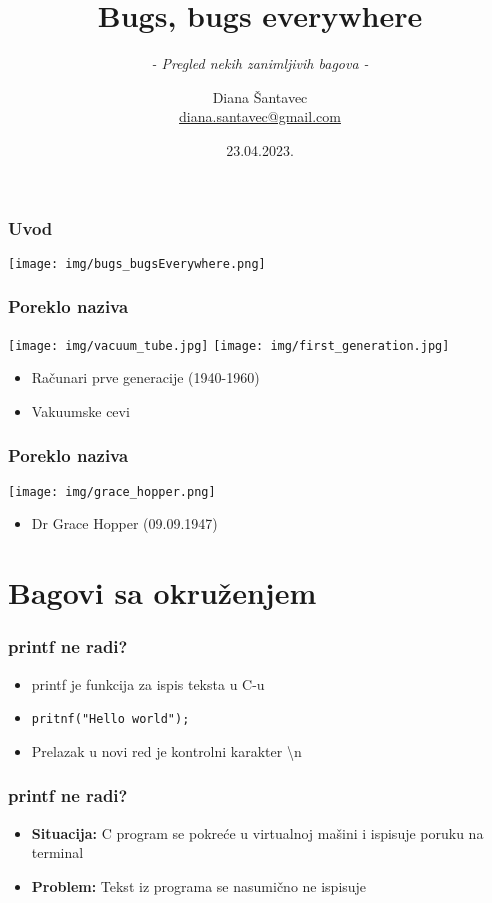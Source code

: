 \documentclass{beamer}
\title{Bugs, bugs everywhere}
\subtitle[]{\textit{ - Pregled nekih zanimljivih bagova -}}
\author[Diana Šantavec]{Diana Šantavec \\ \small \url{diana.santavec@gmail.com}}
\institute{Istraživačka stanica Petnica}
\date{23.04.2023.}
\begin{document}
\frame{\titlepage}


\begin{frame}
\frametitle{Uvod}
\begin{center}
    \texttt{[image: img/bugs\_bugsEverywhere.png]}
\end{center}
\end{frame}

\begin{frame}
    \frametitle{Poreklo naziva}
    \begin{center}
        \texttt{[image: img/vacuum\_tube.jpg]}
        \texttt{[image: img/first\_generation.jpg]}
    \end{center}
    \begin{itemize}
        \item Računari prve generacije (1940-1960) \newline
        \item Vakuumske cevi
    \end{itemize}
\end{frame}

\begin{frame}
    \frametitle{Poreklo naziva}
    \begin{center}
        \texttt{[image: img/grace\_hopper.png]}
    \end{center}
    \begin{itemize}
        \item Dr Grace Hopper (09.09.1947)
    \end{itemize}
\end{frame}

\section{Bagovi sa okruženjem}

\begin{frame}
\frametitle{printf ne radi?}
\begin{itemize}
    \item printf je funkcija za ispis teksta u C-u \newline
    \item \lstinline|pritnf("Hello world");| \newline
    \item Prelazak u novi red je kontrolni karakter \textbackslash n
\end{itemize}
\end{frame}

\begin{frame}
\frametitle{printf ne radi?}
\begin{itemize}
    \item \textbf{Situacija:} C program se pokreće u virtualnoj mašini i ispisuje poruku na terminal \newline
    \item \textbf{Problem:} Tekst iz programa se nasumično ne ispisuje
\end{itemize}
\end{frame}
\end{document}
